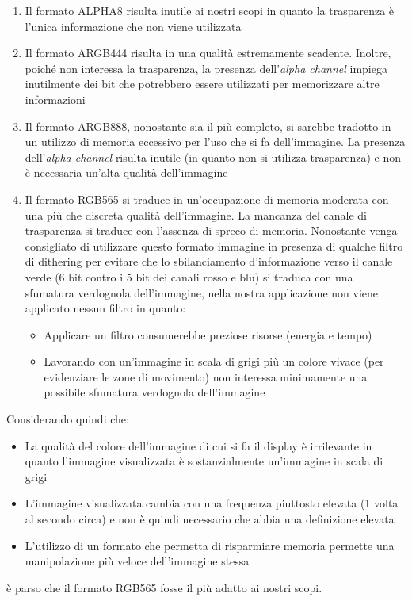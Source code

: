 \begin{enumerate}
  \item Il formato ALPHA8 risulta inutile ai nostri scopi in quanto la trasparenza è l'unica informazione che non viene utilizzata
  \item Il formato ARGB444 risulta in una qualità estremamente scadente. Inoltre, poiché non interessa la trasparenza, la presenza dell'\textit{alpha channel} impiega inutilmente dei bit che potrebbero essere utilizzati per memorizzare altre informazioni
  \item Il formato ARGB888, nonostante sia il più completo, si sarebbe tradotto in un utilizzo di memoria eccessivo per l'uso che si fa dell'immagine. La presenza dell'\textit{alpha channel} risulta inutile (in quanto non si utilizza trasparenza) e non è necessaria un'alta qualità dell'immagine
  \item Il formato RGB565 si traduce in un'occupazione di memoria moderata con una più che discreta qualità dell'immagine. La mancanza del canale di trasparenza si traduce con l'assenza di spreco di memoria. Nonostante venga consigliato di utilizzare questo formato immagine in presenza di qualche filtro di dithering per evitare che lo sbilanciamento d'informazione verso il canale verde (6 bit contro i 5 bit dei canali rosso e blu) si traduca con una sfumatura verdognola dell'immagine, nella nostra applicazione non viene applicato nessun filtro in quanto:
  \begin{itemize}
    \item Applicare un filtro consumerebbe preziose risorse (energia e tempo)
    \item Lavorando con un'immagine in scala di grigi più un colore vivace (per evidenziare le zone di movimento) non interessa minimamente una possibile sfumatura verdognola dell'immagine
  \end{itemize}
\end{enumerate}
Considerando quindi che:
\begin{itemize}
  \item La qualità del colore dell'immagine di cui si fa il display è irrilevante in quanto l'immagine visualizzata è sostanzialmente un'immagine in scala di grigi
  \item L'immagine visualizzata cambia con una frequenza piuttosto elevata (1 volta al secondo circa) e non è quindi necessario che abbia una definizione elevata
  \item L'utilizzo di un formato che permetta di risparmiare memoria permette una manipolazione più veloce dell'immagine stessa
\end{itemize}
è parso che il formato RGB565 fosse il più adatto ai nostri scopi.

